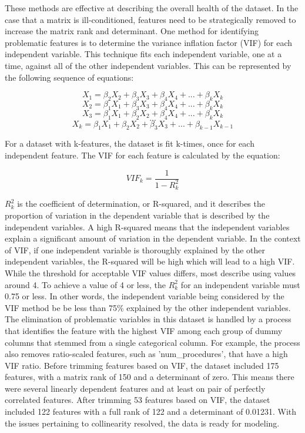 \documentclass[sigconf]{acmart}
\begin{document}
These methods are effective at describing the overall health of the dataset. In the case that a matrix is ill-conditioned, features need to be strategically removed to increase the matrix rank and determinant. One method for identifying problematic features is to determine the variance inflation factor (VIF) for each independent variable. This technique fits each independent variable, one at a time, against all of the other independent variables. This can be represented by the following sequence of equations:

\[X_1 = \beta_2X_2 + \beta_3X_3 + \beta_4X_4 + ... + \beta_kX_k \]
\[X_2 = \beta_1X_1 + \beta_3X_3 + \beta_4X_4 + ... + \beta_kX_k \]
\[X_3 = \beta_1X_1 + \beta_2X_2 + \beta_4X_4 + ... + \beta_kX_k \]
\[...\]
\[X_k = \beta_1X_1 + \beta_2X_2 + \beta_3X_3 + ... + \beta_{k-1}X_{k-1} \]

For a dataset with k-features, the dataset is fit k-times, once for each independent feature. The VIF for each feature is calculated by the equation:

\[ VIF_k =\frac{1}{1 - R^2_k}\]

\(R^2_k\) is the coefficient of determination, or R-squared, and it describes the proportion of variation in the dependent variable that is described by the independent variables. A high R-squared means that the independent variables explain a significant amount of variation in the dependent variable. In the context of VIF, if one independent variable is thoroughly explained by the other independent variables, the R-squared will be high which will lead to a high VIF. While the threshold for acceptable VIF values differs, most describe using values around 4. To achieve a value of 4 or less, the \(R^2_k\) for an independent variable must 0.75 or less. In other words, the independent variable being considered by the VIF method be be less than 75\% explained by the other independent variables.
The elimination of problematic variables in this dataset is handled by a process that identifies the feature with the highest VIF among each group of dummy columns that stemmed from a single categorical column. For example,
the process also removes ratio-scaled features, such as 'num\_procedures', that have a high VIF ratio.
Before trimming features based on VIF, the dataset included 175 features, with a matrix rank of 150 and a determinant of zero. This means there were several linearly dependent features and at least on pair of perfectly correlated features. After trimming 53 features based on VIF, the dataset included 122 features with a full rank of 122 and a determinant of 0.01231. With the issues pertaining to collinearity resolved, the data is ready for modeling.
\end{document}
